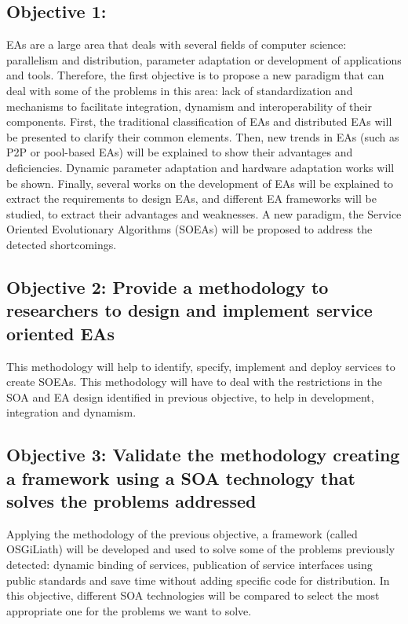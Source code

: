  \subsection*{Objective 1: \objectiveparadigm}
\label{subsec:intro:obj:problems}
EAs are a large area that deals with several fields of computer science: parallelism and distribution, parameter adaptation or development of applications and tools. Therefore, the first objective is to propose a new paradigm that can deal with some of the problems in this area: lack of standardization and mechanisms to facilitate integration, dynamism and interoperability of their components. First, the traditional classification of EAs and distributed EAs will be presented to clarify their common elements. Then, new trends in EAs (such as P2P or pool-based EAs) will be explained to show their advantages and deficiencies. Dynamic parameter adaptation and hardware adaptation works will be shown. Finally, several works on the development of EAs will be explained to extract the requirements to design EAs, and different EA frameworks will be studied, to extract their advantages and weaknesses. A new paradigm, the Service Oriented Evolutionary Algorithms (SOEAs) will be proposed to address the detected shortcomings.

\newcommand{\objectivemethodology}{Provide a methodology to researchers to design and implement service oriented EAs}
\subsection*{Objective 2: \objectivemethodology} 
\label{subsec:intro:obj:methodology}
This methodology will help to identify, specify, implement and deploy services to create SOEAs. This methodology will have to deal with the restrictions in the SOA and EA design identified in previous objective, to help in development, integration and dynamism.

\newcommand{\objectiveframework}{Validate the methodology creating a framework using a SOA technology that solves the problems addressed}
\subsection*{Objective 3: \objectiveframework}
\label{subsec:intro:obj:fwork}
Applying the methodology of the previous objective, a framework (called OSGiLiath) will be developed and used to solve some of the problems previously detected: dynamic binding of services, publication of service interfaces using public standards and save time without adding specific code for distribution. In this objective, different SOA technologies will be compared to select the most appropriate one for the problems we want to solve.

